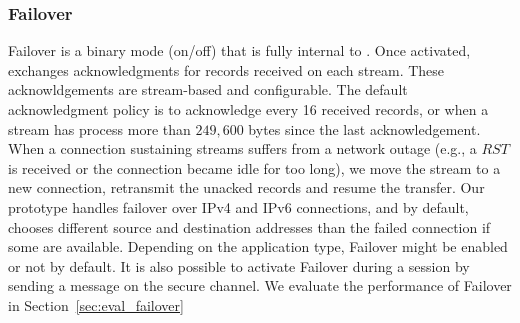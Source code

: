 \subsubsection{Failover}\label{failover}
Failover is a binary mode (on/off) that is fully internal to \tcpls.
Once activated,
\tcpls exchanges acknowledgments for records received on each stream. These
acknowldgements are stream-based and configurable. The default acknowledgment
policy is to acknowledge every 16 received records, or when a stream has process more
than $249,600$ bytes since the last acknowledgement. When a \tcp connection
sustaining \tcpls streams suffers from a network outage (e.g., a $RST$ is
received or the connection became idle for too long), we move the stream to a
new \tcp connection, retransmit the unacked records and resume the transfer. Our
prototype handles failover over IPv4 and IPv6 \tcp connections, and by default,
chooses different source and destination addresses than the failed \tcp
connection if some are available.
Depending on the application type, Failover
might be enabled or not by default. It is also possible to activate Failover during a \tcpls session by sending a message on the secure channel. 
We evaluate the performance of Failover in Section~\ref{sec:eval_failover}





